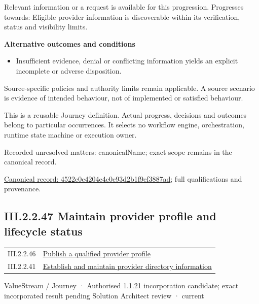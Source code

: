 Relevant information or a request is available for this progression. Progresses towards: Eligible provider information is discoverable within its verification, status and visibility limits.



\par\medskip\textbf{Alternative outcomes and conditions}\par


\begin{itemize}


\item Insufficient evidence, denial or conflicting information yields an explicit incomplete or adverse disposition.

\end{itemize}


Source-specific policies and authority limits remain applicable. A source scenario is evidence of intended behaviour, not of implemented or satisfied behaviour.



This is a reusable Journey definition. Actual progress, decisions and outcomes belong to particular occurrences. It selects no workflow engine, orchestration, runtime state machine or execution owner.


{\small Recorded unresolved matters: canonicalName; exact scope remains in the canonical record.}\par
{\footnotesize \href{../../../../continuum/strategy/value-stream/4522e0c4204e4c0c93d2b1f9ef3887ad.md}{Canonical record: 4522e0c4204e4c0c93d2b1f9ef3887ad}; full qualifications and provenance.}\par
\subsection*{III.2.2.47 Maintain provider profile and lifecycle status}
\label{navigation:III.2.2.47}

\begin{longtable}{p{.22\linewidth}p{.73\linewidth}}
III.2.2.46 & \hyperref[element:4522e0c4204e4c0c93d2b1f9ef3887ad]{Publish a qualified provider profile} \\
III.2.2.41 & \hyperref[element:679b0055ee5d42d4a838e35edd3de01f]{Establish and maintain provider directory information} \\
\end{longtable}
\label{element:79cb51c0f6184273af18b5e0bac64720}
{\small ValueStream / Journey · Authorised 1.1.21 incorporation candidate; exact incorporated result pending Solution Architect review · current}\par

